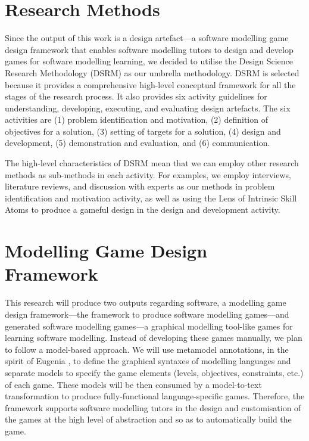 \documentclass[runningheads,a4paper]{llncs}
\begin{document}
\section{Research Methods}
Since the output of this work is a design artefact---a software modelling game design framework that enables software modelling tutors to design and develop games for software modelling learning, we decided to utilise the Design Science Research Methodology (DSRM) \cite{peffers2007design} as our umbrella methodology. DSRM is selected because it provides a comprehensive high-level conceptual framework for all the stages of the research process. It also provides six activity guidelines for understanding, developing, executing, and evaluating design artefacts. The six activities are (1) problem identification and motivation, (2) definition of objectives for a solution, (3) setting of targets for a solution, (4) design and development, (5) demonstration and evaluation, and (6) communication. 

The high-level characteristics of DSRM mean that we can employ other research methods as sub-methods in each activity. For examples, we employ interviews, literature reviews, and discussion with experts as our methods in problem identification and motivation activity, as well as using the Lens of Intrinsic Skill Atoms \cite{deterding2015lens} to produce a gameful design in the design and development activity.

\section{Modelling Game Design Framework}
This research will produce two outputs regarding software, a modelling game design framework---the framework to produce software modelling games---and generated software modelling games---a graphical modelling tool-like games for learning software modelling. Instead of developing these games manually, we plan to follow a model-based approach. We will use metamodel annotations, in the spirit of Eugenia \cite{kolovos2015eugenia}, to define the graphical syntaxes of modelling languages and separate models to specify the game elements (levels, objectives, constraints, etc.) of each game. These models will be then consumed by a model-to-text transformation to produce fully-functional language-specific games. Therefore, the framework supports software modelling tutors in the design and customisation of the games at the high level of abstraction and so as to automatically build the game. 
\end{document}
